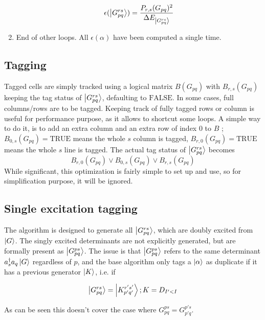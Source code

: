 \documentclass[./thesis.tex]{subfiles}
\newcommand{\Gpqrs}{\ket{G^{rs}_{pq}}}
\begin{document}
\begin{enumerate}
\begin{equation}
\epsilon(\ket {G_{pq}^{rs}}) = \frac{P_{r,s}(G_{pq})^2}{\Delta E_{\Gpqrs}}
\end{equation}
\item
End of other loops. All $\epsilon(\alpha)$ have been computed a single time.

\end{enumerate}


\subsection{Tagging}

Tagged cells are simply tracked using a logical matrix $B(G_{pq})$ with $B_{r,s}(G_{pq})$ keeping the tag status of $\Gpqrs$, defaulting to $\text{FALSE}$. 
In some cases, full columns/rows are to be tagged. Keeping track of fully tagged rows or column is useful for performance purpose, as it allows to shortcut some loops. A simple way to do it, is to add an extra column and an extra row of index $0$ to $B$ ; $B_{0,s}(G_{pq}) = \text{TRUE}$ means the whole $s$ column is tagged, $B_{r,0}(G_{pq}) = \text{TRUE}$ means the whole $s$ line is tagged. The actual tag status of $\Gpqrs$ becomes
\begin{equation}
B_{r,0}(G_{pq}) \vee B_{0,s}(G_{pq}) \vee B_{r,s}(G_{pq})
\end{equation}
While significant, this optimization is fairly simple to set up and use, so for simplification purpose, it will be ignored.


\subsection{Single excitation tagging}
\label{single_tagging}
The algorithm is designed to generate all $\ket {G_{pq}^{rs}}$, which are doubly excited from $\ket G$. The singly excited determinants are not explicitly generated, but are formally present as $\ket{G_{pq}^{ps}}$.
The issue is that $\ket{G_{pq}^{ps}}$ refers to the same determinant $a^\dagger_s a_q \ket{G}$ regardless of $p$, and the base algorithm only tags a ${\ket{\alpha}}$ as duplicate if it has a previous generator $\ket K$, i.e. if

\begin{equation}
\ket {G_{pq}^{rs}} = \ket {K_{p'q'}^{r's'}} ; K = D_{I'<I}
\end{equation}

As can be seen this doesn't cover the case where $G_{pq}^{ps} = G_{p'q}^{p's}$.
\end{document}
